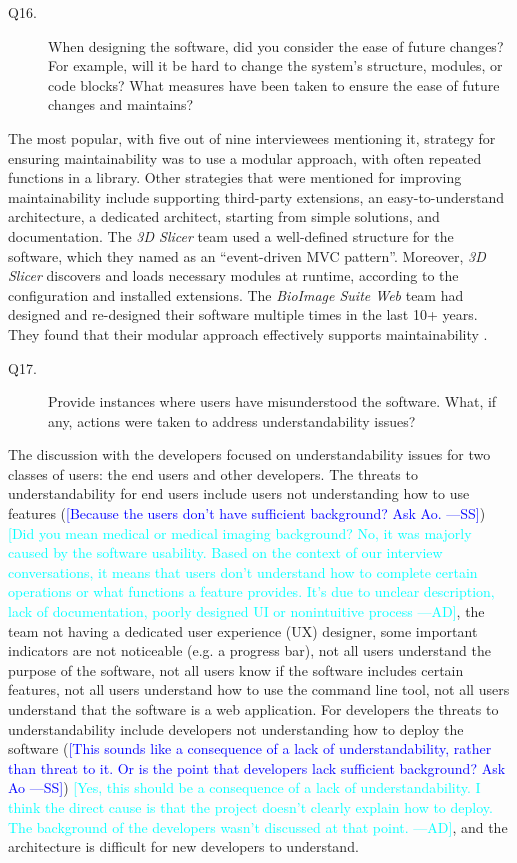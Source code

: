 \documentclass[final, 3p, times, authoryear]{elsarticle}
\newcommand{\authornote}[3]{\textcolor{#1}{[#3 ---#2]}}
\newcommand{\authornote}[3]{}
\newcommand{\wss}[1]{\authornote{blue}{SS}{#1}} %
\newcommand{\ad}[1]{\authornote{cyan}{AD}{#1}} %
\begin{document}
\begin{description}
\item[Q16.] When designing the software, did you consider the ease of future
changes? For example, will it be hard to change the system’s structure, modules,
or code blocks? What measures have been taken to ensure the ease of future
changes and maintains?
\end{description}

The most popular, with five out of nine interviewees mentioning it, strategy for
ensuring maintainability was to use a modular approach, with often repeated
functions in a library.  Other strategies that were mentioned for improving
maintainability include supporting third-party extensions, an easy-to-understand
architecture, a dedicated architect, starting from simple solutions, and
documentation.  The \textit{3D Slicer} team used a well-defined structure for
the software, which they named as an ``event-driven MVC pattern''. Moreover,
\textit{3D Slicer} discovers and loads necessary modules at runtime, according
to the configuration and installed extensions. The \textit{BioImage Suite Web}
team had designed and re-designed their software multiple times in the last 10+
years. They found that their modular approach effectively supports
maintainability \citep{Joshi2011}. 

\begin{description}
\item[Q17.] Provide instances where users have misunderstood the software. What,
if any, actions were taken to address understandability issues?
\end{description}

The discussion with the developers focused on understandability issues for two
classes of users: the end users and other developers.  The threats to
understandability for end users include users not understanding how to use
features (\wss{Because the users don't have sufficient background?  Ask Ao.})
\ad{Did you mean medical or medical imaging background? No, it was majorly
caused by the software usability. Based on the context of our interview
conversations, it means that users don't understand how to complete certain
operations or what functions a feature provides. It's due to unclear description,
lack of documentation, poorly designed UI or nonintuitive process},
the team not having a dedicated user experience (UX) designer, some important
indicators are not noticeable (e.g. a progress bar), not all users understand
the purpose of the software, not all users know if the software includes certain
features, not all users understand how to use the command line tool, not all
users understand that the software is a web application. For developers the
threats to understandability include developers not understanding how to deploy
the software (\wss{This sounds like a consequence of a lack of
understandability, rather than threat to it.  Or is the point that developers
lack sufficient background?  Ask Ao}) \ad{Yes, this should be a consequence of a
lack of understandability. I think the direct cause is that the project doesn't
clearly explain how to deploy. The background of the developers wasn't discussed
at that point.}, and the architecture is difficult for new
developers to understand.
\end{document}
